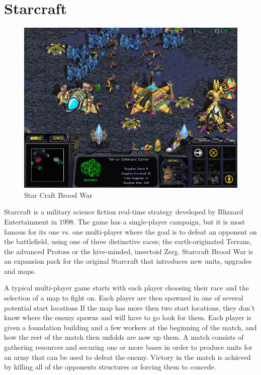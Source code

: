 
\section{Starcraft}

\begin{figure}[h!tb]
\centering
\includegraphics[scale=0.5]{graphics/scbw.jpg}
\caption{Star Craft Brood War}
\label{fig:scbwIntro}
\end{figure}

Starcraft is a military science fiction real-time strategy developed by Blizzard
Entertainment in 1998.\cite{starcraft} The game has a single-player campaign,
but it is most famous for its one vs. one multi-player where the goal is to
defeat an opponent on the battlefield, using one of three distinctive races;
the earth-originated Terrans, the advanced Protoss or the hive-minded,
insectoid Zerg. Starcraft Brood War is an expansion pack for the original
Starcraft that introduces new units, upgrades and maps. 


A typical multi-player game starts with each player choosing their race and the
selection of a map to fight on. Each player are then spawned in one of
several potential start locations If the map has more then two start
locations, they don't know where the enemy spawns and will have to go look for
them. Each player is given a foundation building and a few workers at the
beginning of the match, and how the rest of the match then unfolds are now up
them. A match consists of gathering resources and securing one or more bases in
order to produce units for an army that can be used to defeat the enemy. Victory
in the match is achieved by killing all of the opponents structures or forcing
them to concede.

